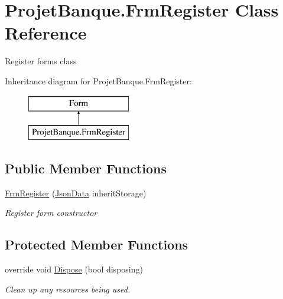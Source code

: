 \hypertarget{class_projet_banque_1_1_frm_register}{}\section{Projet\+Banque.\+Frm\+Register Class Reference}
\label{class_projet_banque_1_1_frm_register}


Register form\textquotesingle{}s class  


Inheritance diagram for Projet\+Banque.\+Frm\+Register\+:\begin{figure}[H]
\begin{center}
\leavevmode
\includegraphics[height=2.000000cm]{class_projet_banque_1_1_frm_register}
\end{center}
\end{figure}
\subsection*{Public Member Functions}
\begin{DoxyCompactItemize}
\item 
\mbox{\hyperlink{class_projet_banque_1_1_frm_register_a292dc36061f06527217b4dc3a14a868e}{Frm\+Register}} (\mbox{\hyperlink{class_projet_banque_1_1_json_data}{Json\+Data}} inherit\+Storage)
\begin{DoxyCompactList}\small\item\em Register form constructor \end{DoxyCompactList}\end{DoxyCompactItemize}
\subsection*{Protected Member Functions}
\begin{DoxyCompactItemize}
\item 
override void \mbox{\hyperlink{class_projet_banque_1_1_frm_register_a5f53078c455923563c63a457f63895a9}{Dispose}} (bool disposing)
\begin{DoxyCompactList}\small\item\em Clean up any resources being used. \end{DoxyCompactList}\end{DoxyCompactItemize}


